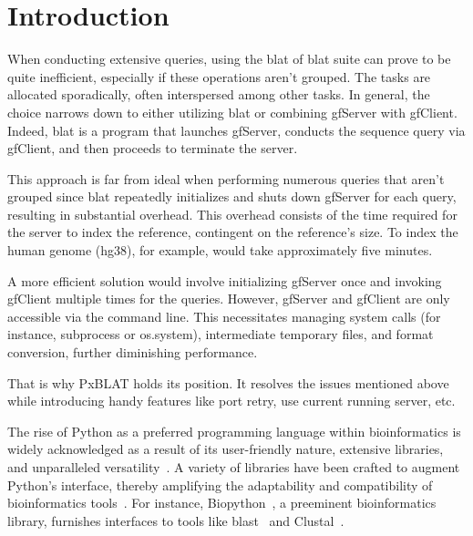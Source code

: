 \documentclass[unnumsec,webpdf,contemporary,large,namedate]{oup-authoring-template}%
\theoremstyle{thmstyleone}%
\theoremstyle{thmstyletwo}%
\theoremstyle{thmstylethree}%
\begin{document}

\maketitle

\section{Introduction}

When conducting extensive queries, using the blat of \gls{blat} suite can prove to be quite inefficient, especially if these operations aren't grouped. The tasks are allocated sporadically, often interspersed among other tasks. In general, the choice narrows down to either utilizing blat or combining gfServer with gfClient. Indeed, blat is a program that launches gfServer, conducts the sequence query via gfClient, and then proceeds to terminate the server.

This approach is far from ideal when performing numerous queries that aren't grouped since blat repeatedly initializes and shuts down gfServer for each query, resulting in substantial overhead. This overhead consists of the time required for the server to index the reference, contingent on the reference's size. To index the human genome (hg38), for example, would take approximately five minutes.

A more efficient solution would involve initializing gfServer once and invoking gfClient multiple times for the queries. However, gfServer and gfClient are only accessible via the command line. This necessitates managing system calls (for instance, subprocess or os.system), intermediate temporary files, and format conversion, further diminishing performance.

That is why PxBLAT holds its position. It resolves the issues mentioned above while introducing handy features like port retry, use current running server, etc.

The rise of Python as a preferred programming language within bioinformatics is widely acknowledged as a result of its user-friendly nature, extensive libraries, and unparalleled versatility~\citep{perkel2015programming}.
A variety of libraries have been crafted to augment Python's interface, thereby amplifying the adaptability and compatibility of bioinformatics tools~\citep{putri2022analysing, cock2009biopython}.
For instance, Biopython~\citep{cock2009biopython}, a preeminent bioinformatics library, furnishes interfaces to tools like \gls{blast}~\citep{altschul1990basic} and Clustal~\citep{higgins1988clustal}.
\end{document}

